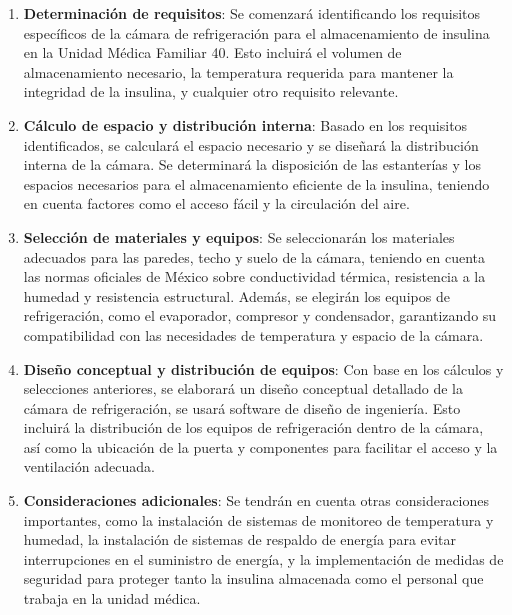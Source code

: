  \begin{enumerate}
 	\item \textbf{Determinación de requisitos}: Se comenzará identificando los requisitos específicos de la cámara de refrigeración para el almacenamiento de insulina en la Unidad Médica Familiar 40. Esto incluirá el volumen de almacenamiento necesario, la temperatura requerida para mantener la integridad de la insulina, y cualquier otro requisito relevante.
 	
 	\item \textbf{Cálculo de espacio y distribución interna}: Basado en los requisitos identificados, se calculará el espacio necesario y se diseñará la distribución interna de la cámara. Se determinará la disposición de las estanterías y los espacios necesarios para el almacenamiento eficiente de la insulina, teniendo en cuenta factores como el acceso fácil y la circulación del aire.
 	
 	\item \textbf{Selección de materiales y equipos}: Se seleccionarán los materiales adecuados para las paredes, techo y suelo de la cámara, teniendo en cuenta las normas oficiales de México sobre conductividad térmica, resistencia a la humedad y resistencia estructural. Además, se elegirán los equipos de refrigeración, como el evaporador, compresor y condensador, garantizando su compatibilidad con las necesidades de temperatura y espacio de la cámara.
 	
 	\item \textbf{Diseño conceptual y distribución de equipos}: Con base en los cálculos y selecciones anteriores, se elaborará un diseño conceptual detallado de la cámara de refrigeración, se usará software de diseño de ingeniería. Esto incluirá la distribución de los equipos de refrigeración dentro de la cámara, así como la ubicación de la puerta y componentes para facilitar el acceso y la ventilación adecuada.
 	
 	\item \textbf{Consideraciones adicionales}: Se tendrán en cuenta otras consideraciones importantes, como la instalación de sistemas de monitoreo de temperatura y humedad, la instalación de sistemas de respaldo de energía para evitar interrupciones en el suministro de energía, y la implementación de medidas de seguridad para proteger tanto la insulina almacenada como el personal que trabaja en la unidad médica.
 \end{enumerate}

